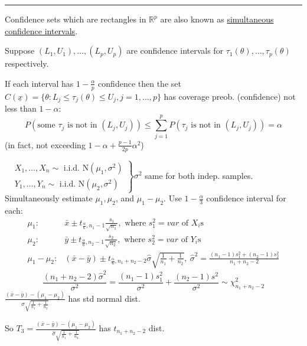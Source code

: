 \documentclass[english, 11pt]{article}
\begin{document}
\hrule
\bigskip

Confidence sets which are rectangles in $\mathbb{R}^p$ are also known as \underline{simultaneous confidence intervals}.
\begin{defn}\label{defn:65}
Suppose $(L_1, U_1), \dots, (L_p, U_p)$ are confidence intervals for $\tau_1(\theta), \dots, \tau_p(\theta)$ respectively.

If each interval has $1-\frac{\alpha}{p}$ confidence then the set $C(\underline{x})=\{\theta:L_j\leqslant\tau_j(\theta)\leqslant U_j, j=1, \dots, p\}$ has coverage  preob. (confidence) not less than $1-\alpha$:
$$
P(\text{some $\tau_j$ is not in }(L_j, U_j))\leqslant\sum_{j=1}^pP(\tau_j\text{ is not in }(L_j, U_j))=\alpha
$$
(in fact, not exceeding $1-\alpha+\frac{p-1}{2p}\alpha^2$)
\end{defn}

\begin{exmp}\label{exmp:66}
$\left.\begin{aligned}
&X_1, \dots, X_n\sim\text{ i.i.d. N}(\mu_1, \sigma^2)\\
&Y_1, \dots, Y_n\sim\text{ i.i.d. N}(\mu_2, \sigma^2)
\end{aligned}\right\}\sigma^2
$ same for both indep. samples. Simultaneously estimate $\mu_1, \mu_2$, and $\mu_1-\mu_2$. Use $1-\frac{\alpha}{3}$ confidence interval for each:
$$
\begin{aligned}
\mu_1:&\bar{x}\pm t_{\frac{\alpha}{6}, n_1-1}\frac{s_1}{\sqrt{n_1}}, \text{ where }s_1^2=var\text{ of } X_i\text{s}\\
\mu_2:&\bar{y}\pm t_{\frac{\alpha}{6}, n_2-1}\frac{s_2}{\sqrt{n_2}}, \text{ where }s_2^2=var\text{ of } Y_i\text{s}\\
\mu_1-\mu_2:&(\bar{x}-\bar{y})\pm t_{\frac{\alpha}{6}, n_1+n_2-2}\hat{\sigma}\sqrt{\frac{1}{n_1}+\frac{1}{n_2}}, ~\hat{\sigma}^2=\frac{(n_1-1)s_1^2+(n_2-1)s_2^2}{n_1+n_2-2}
\end{aligned}
$$
$$
\frac{(n_1+n_2-2)\hat{\sigma}^2}{\sigma^2}=\frac{(n_1-1)s_1^2}{\sigma^2}+\frac{(n_2-1)s^2}{\sigma^2}\sim\chi^2_{n_1+n_2-2}
$$
$\frac{(\bar{x}-\bar{y})-(\mu_1-\mu_2)}{\sigma\sqrt{\frac{1}{n_1}+\frac{1}{n_2}}}$ has std normal dist.

So $T_3=\frac{(\bar{x}-\bar{y})-(\mu_1-\mu_2)}{\hat{\sigma}\sqrt{\frac{1}{n_1}+\frac{1}{n_2}}}$ has $t_{n_1+n_2-2}$ dist.
\end{exmp}
\end{document}
